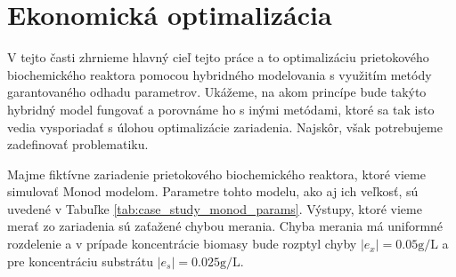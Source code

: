 \section{Ekonomická optimalizácia}
V tejto časti zhrnieme hlavný cieľ tejto práce a to optimalizáciu prietokového biochemického reaktora pomocou hybridného modelovania s využitím metódy garantovaného odhadu parametrov. Ukážeme, na akom princípe bude takýto hybridný model fungovať a porovnáme ho s inými metódami, ktoré sa tak isto vedia vysporiadať s úlohou optimalizácie zariadenia. Najskôr, však potrebujeme zadefinovať problematiku.

Majme fiktívne zariadenie prietokového biochemického reaktora, ktoré vieme simulovať Monod modelom. Parametre tohto modelu, ako aj ich veľkosť, sú uvedené v Tabuľke \ref{tab:case_study_monod_params}. Výstupy, ktoré vieme merať zo zariadenia sú zaťažené chybou merania. Chyba merania má uniformné rozdelenie a v prípade koncentrácie biomasy bude rozptyl chyby $ \left|e_{x}\right| = 0.05\si{\gram\per\liter} $ a pre koncentráciu substrátu $ \left|e_{s}\right| = 0.025\si{\gram\per\liter} $.

